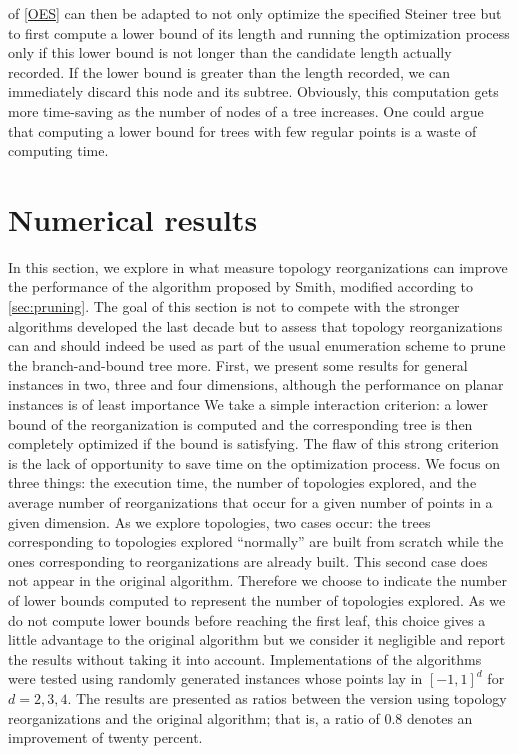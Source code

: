 \documentclass{article}
\theoremstyle{plain}
\begin{document}
 of \cref{OES} can then be adapted to not only optimize the specified Steiner tree but to first compute a lower bound of its length and running the optimization process only if this lower bound is not longer than the candidate length actually recorded. 
If the lower bound is greater than the length recorded, we can immediately discard this node and its subtree. 
Obviously, this computation gets more time-saving as the number of nodes of a tree increases. 
One could argue that computing a lower bound for trees with few regular points is a waste of computing time.











\FloatBarrier


\section{Numerical results}
\label{sec:results}

In this section, we explore in what measure topology reorganizations can improve the performance of the algorithm proposed by Smith, modified according to \cref{sec:pruning}. 
The goal of this section is not to compete with the stronger algorithms \cite{Fampa}\cite{Fonseca}\cite{Laarhoven} developed the last decade but to assess that topology reorganizations can and should indeed be used as part of the usual enumeration scheme to prune the branch-and-bound tree more.     
First, we present some results for general instances in two, three and four dimensions, although the performance on planar instances is of least importance 
We take a simple interaction criterion: a lower bound of the reorganization is computed and the corresponding tree is then completely optimized if the bound is satisfying. 
The flaw of this strong criterion is the lack of opportunity to save time on the optimization process. 
We focus on three things: the execution time, the number of topologies explored, and the average number of reorganizations that occur for a given number of points in a given dimension. 
As we explore topologies, two cases occur: the trees corresponding to topologies explored ``normally'' are built from scratch while the ones corresponding to reorganizations are already built. 
This second case does not appear in the original algorithm.
Therefore we choose to indicate the number of lower bounds computed to represent the number of topologies explored.
As we do not compute lower bounds before reaching the first leaf, this choice gives a little advantage to the original algorithm but we consider it negligible and report the results without taking it into account.
Implementations of the algorithms were tested using randomly generated instances whose points lay in $\left[-1, 1\right]^d$ for $d=2,3,4$. 
The results are presented as ratios between the version using topology reorganizations and the original algorithm; 
that is, a ratio of 0.8 denotes an improvement of twenty percent.
\end{document}
